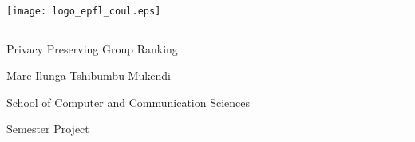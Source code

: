 
%        




\newcommand{\logoepfl}[0]{
  \begin{center}
    \texttt{[image: logo\_epfl\_coul.eps]}
  \end{center}
  \vspace{0.3cm}
  \hrule
}
\newcommand{\logolasec}[0]{
  \vspace{1cm}
  \hrule
  \begin{center}
    \texttt{[image: logo\_lasec\_coul.eps]}
  \end{center}
}
\newcommand{\project}[1]{
  \begin{center}
    \large{#1}
  \end{center}
  \vspace{1cm}
}
\newcommand{\department}[1]{
  \begin{center}
    \large{#1}
  \end{center}
}
\newcommand{\supervisor}[3]{
  \begin{center}
    \begin{normalsize}{
        \bf #1}\\#2\\#3
    \end{normalsize}
  \end{center}
}
\renewcommand{\author}[1]{
  \begin{center}
    \Large{#1}
  \end{center}
  \vspace{0.5cm}
}
\renewcommand{\title}[1]{
  \vspace{3cm}
  \begin{center}
    \huge{#1}
  \end{center}
  \vspace{1.7cm}
}
\renewcommand{\date}[2]{
  \begin{center}
    \normalsize{#1 #2}
  \end{center}
  \vspace{0.5cm}
}


\thispagestyle{empty}


  \logoepfl
  
  \title{Privacy Preserving Group Ranking}
  
  \author{Marc Ilunga Tshibumbu Mukendi}
  \department{School of Computer and Communication Sciences}
  \project{Semester Project}
  

